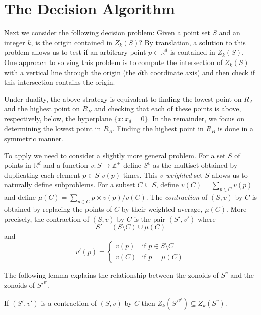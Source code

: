 \documentclass[lotsofwhite]{patmorin}
\begin{document}
\section{The Decision Algorithm}

Next we consider the following decision problem:  Given a point set
$S$ and an integer $k$, is the origin contained in $Z_k(S)$?  By
translation, a solution to this problem allows us to test if an
arbitrary point $p\in\mathbb{R}^d$ is contained in $Z_k(S)$. One
approach to solving this problem is to compute the intersection of
$Z_k(S)$ with a vertical line through the origin (the $d$th coordinate
axis) and then check if this intersection contains the origin. 

Under duality, the above strategy is equivalent to finding the lowest
point on $R_A$ and the highest point on $R_B$ and checking that each
of these points is above, respectively, below, the hyperplane
$\{x:x_d=0\}$.
In the remainder, we focus on determining the lowest point in $R_A$.
Finding the highest point in $R_B$ is done in a symmetric manner.  

To apply  we need to consider a slightly more general
problem.  For a set $S$ of points in $\mathbb{R}^d$ and a function
$v:S\mapsto\mathbb{Z}^+$ define $S^v$ as the multiset obtained by
duplicating each element $p\in S$ $v(p)$ times.  This
\emph{$v$-weighted} set $S$ allows us to naturally define subproblems.
For a subset $C\subseteq S$, define $v(C)=\sum_{p\in C}v(p)$ and
define $\mu(C)=\sum_{p\in C} p\times v(p)/v(C)$.  The
\emph{contraction} of $(S,v)$ by $C$ is obtained by replacing the
points of $C$ by their weighted average, $\mu(C)$.  More precisely,
the contraction of $(S,v)$ by $C$ is the pair $(S',v')$ where
\[
    S' = (S\setminus C)
	\cup \mu(C)
\]
and 
\[
    v'(p) = \left\{\begin{array}{ll}
                   v(p) & \mbox{if $p\in S\setminus C$} \\
                   v(C) & \mbox{if $p=\mu(C)$}
    \end{array}\right.
\]

The following lemma explains the relationship between the zonoids of
$S^v$ and the zonoids of $S'^{v'}$.

\begin{lem}
If $(S',v')$ is a contraction of $(S,v)$ by $C$ then $Z_k(S'^{v'})
\subseteq Z_k(S^v)$.
\end{lem}
\end{document}
